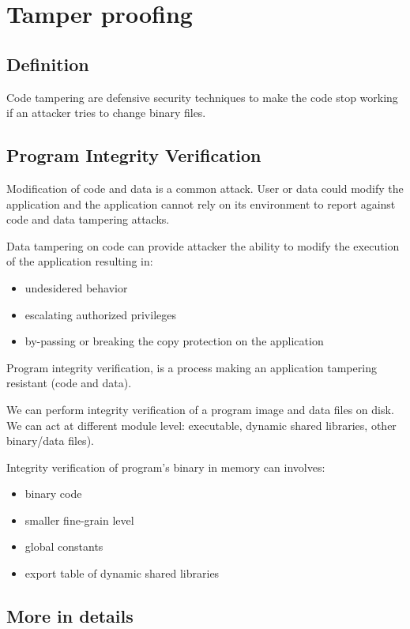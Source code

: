 \section{Tamper proofing}

\subsection{Definition}

Code tampering are defensive security techniques to make the code stop working if an attacker tries to change binary files.

\subsection{Program Integrity Verification}

Modification of code and data is a common attack. User or data could modify the application and the application cannot rely on its environment to report against code and data tampering attacks. 
\par
Data tampering on code can provide attacker the ability to modify the execution of the application resulting in: 
\begin{itemize}
    \item undesidered behavior
    \item escalating authorized privileges
    \item by-passing or breaking the copy protection on the application
\end{itemize}

Program integrity verification, is a process making an application tampering resistant  (code and data). 

We can perform integrity verification of a program image and data files on disk. 
We can act at different module level: executable, dynamic shared libraries, other binary/data files).

Integrity verification of program's binary in memory can involves: 
\begin{itemize}
    \item binary code
    \item smaller fine-grain level
    \item global constants
    \item export table of dynamic shared libraries
\end{itemize}


\subsection{More in details}

